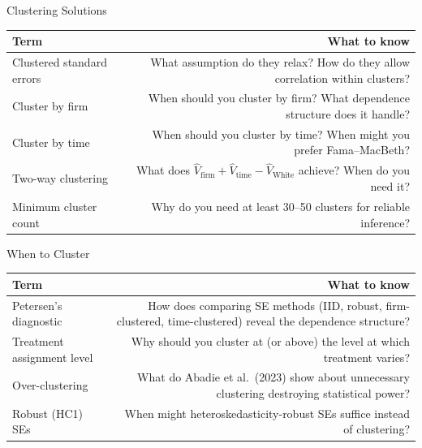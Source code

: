\documentclass[9pt,aspectratio=169]{beamer}
\begin{document}
\begin{frame}{Clustering Solutions}

\begin{tabular}{@{}lR@{}}
\toprule
\textbf{Term} & \textbf{What to know} \\
\midrule
\alert{Clustered standard errors} & What assumption do they relax? How do they allow correlation within clusters? \\[0.8em]
\alert{Cluster by firm} & When should you cluster by firm? What dependence structure does it handle? \\[0.8em]
\alert{Cluster by time} & When should you cluster by time? When might you prefer Fama--MacBeth? \\[0.8em]
\alert{Two-way clustering} & What does $\hat{V}_{\text{firm}} + \hat{V}_{\text{time}} - \hat{V}_{\text{White}}$ achieve? When do you need it? \\[0.8em]
\alert{Minimum cluster count} & Why do you need at least 30--50 clusters for reliable inference? \\
\bottomrule
\end{tabular}

\end{frame}


\begin{frame}{When to Cluster}

\begin{tabular}{@{}lR@{}}
\toprule
\textbf{Term} & \textbf{What to know} \\
\midrule
\alert{Petersen's diagnostic} & How does comparing SE methods (IID, robust, firm-clustered, time-clustered) reveal the dependence structure? \\[0.8em]
\alert{Treatment assignment level} & Why should you cluster at (or above) the level at which treatment varies? \\[0.8em]
\alert{Over-clustering} & What do Abadie et al.\ (2023) show about unnecessary clustering destroying statistical power? \\[0.8em]
\alert{Robust (HC1) SEs} & When might heteroskedasticity-robust SEs suffice instead of clustering? \\
\bottomrule
\end{tabular}

\end{frame}


\end{document}
